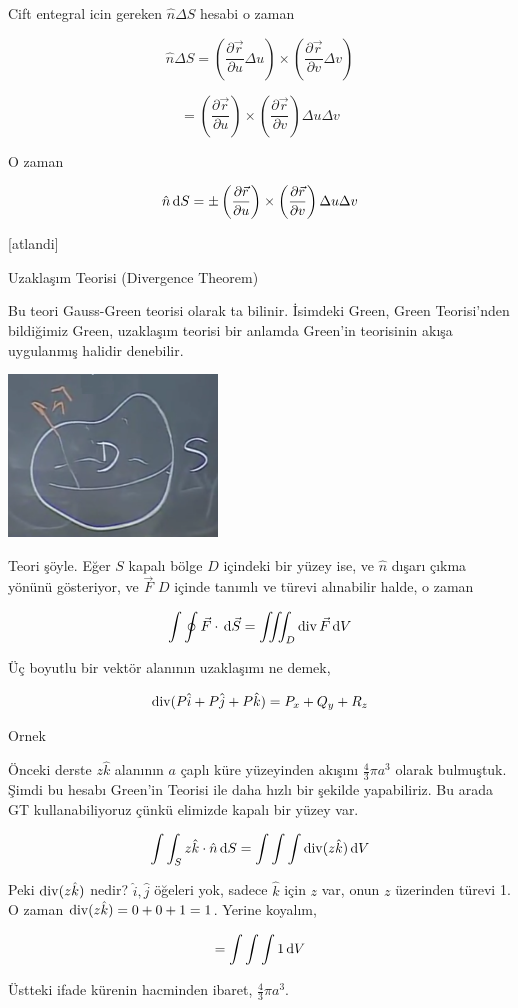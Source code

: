 \documentclass[12pt,fleqn]{article}\usepackage{../../common}
\begin{document}
Cift entegral icin gereken $\hat{n} \Delta S$ hesabi o zaman

$$
\hat{n} \Delta S =
\left( \frac{\partial \vec{r}}{\partial u} \Delta u \right) \times
\left( \frac{\partial \vec{r}}{\partial v} \Delta v \right) 
$$

$$
= \left( \frac{\partial \vec{r}}{\partial u} \right) \times
\left( \frac{\partial \vec{r}}{\partial v}  \right) \Delta u \Delta v
$$

O zaman

$$
\hat{n} \,\mathrm{d} S = \pm
\left( \frac{\partial \vec{r}}{\partial u} \right) \times
\left( \frac{\partial \vec{r}}{\partial v}  \right) \Delta u \Delta v
$$

[atlandi]

Uzaklaşım Teorisi (Divergence Theorem)

Bu teori Gauss-Green teorisi olarak ta bilinir. İsimdeki Green, Green
Teorisi'nden bildiğimiz Green, uzaklaşım teorisi bir anlamda Green'in teorisinin
akışa uygulanmış halidir denebilir.

\includegraphics[width=15em]{calc_multi_28_06.png}

Teori şöyle. Eğer $S$ kapalı bölge $D$ içindeki bir yüzey ise, ve $\hat{n}$
dışarı çıkma yönünü gösteriyor, ve $\vec{F}$ $D$ içinde tanımlı ve türevi
alınabilir halde, o zaman

$$
\int \oint \vec{F} \cdot \,\mathrm{d} \vec{S} =
\iiint_D \operatorname{div} \vec{F} \,\mathrm{d} V
$$

Üç boyutlu bir vektör alanının uzaklaşımı ne demek,

$$
\operatorname{div} (P \hat{i} + P \hat{j} + P \hat{k} ) = P_x + Q_y + R_z
$$

Ornek

Önceki derste $z \hat{k}$ alanının $a$ çaplı küre yüzeyinden akışını
$\frac{4}{3} \pi a^3$ olarak bulmuştuk. Şimdi bu hesabı Green'in Teorisi
ile daha hızlı bir şekilde yapabiliriz. Bu arada GT kullanabiliyoruz çünkü
elimizde kapalı bir yüzey var.

$$
\int \int_S z \hat{k} \cdot \hat{n} \,\mathrm{d} S =
\int \int \int \operatorname{div} (z\hat{k}) \,\mathrm{d} V
$$

Peki $\operatorname{div} (z\hat{k})$ nedir? $\hat{i},\hat{j}$ öğeleri yok, sadece
$\hat{k}$ için $z$ var, onun $z$ üzerinden türevi 1. O zaman
$\operatorname{div} (z\hat{k}) = 0 + 0 + 1 = 1$. Yerine koyalım,

$$
= \int \int \int 1 \,\mathrm{d} V
$$

Üstteki ifade kürenin hacminden ibaret, $\frac{4}{3} \pi a^3$. 
\end{document}

